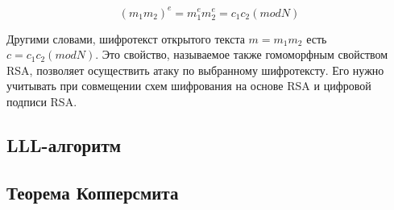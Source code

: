     \begin{equation}
      \textit{{$(m_1 m_2)^e = m_1^e m_2^e = c_1 c_2 (mod N)$}}
    \end{equation}

  Другими словами, шифротекст открытого текста \textit{{$m = m_1 m_2$}} есть \textit{{$c = c_1 c_2 (mod N)$}}. Это свойство, называемое также гомоморфным 
  свойством  RSA, позволяет осуществить атаку по выбранному шифротексту. Его нужно учитывать при совмещении схем шифрования на основе RSA и цифровой подписи
  RSA.

\subsection{LLL-алгоритм}

\subsection{Теорема Копперсмита}